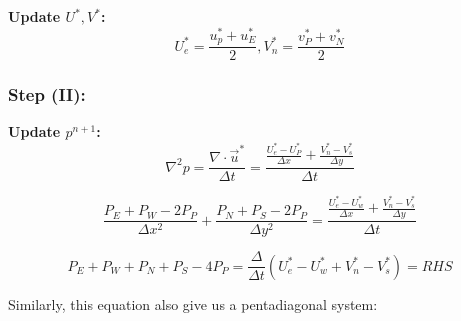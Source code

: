 \documentclass[12pt]{article}
\begin{document}

    
    

    




\textbf{Update $U^*, V^*$:}\\
    $$ U_e^* = \frac{u_p^*+u_E^*}{2} , V_n^* = \frac{v_P^*+v_N^*}{2}$$


\subsubsection{Step (II):}
\textbf{Update $p^{n+1}$:}\\

$$
    \nabla^2 p = \frac{\nabla \cdot \vec{u}^*}{\Delta t}= \frac{\frac{U_e^* - U_P^*}{\Delta x} + \frac{V_n^* - V_s^*}{\Delta y}}{\Delta t}
$$

$$
\frac{P_E + P_W - 2P_P}{\Delta x^2} + \frac{P_N + P_S - 2P_P}{\Delta y^2} = \frac{\frac{U_e^* - U_w^*}{\Delta x} + \frac{V_n^* - V_s^*}{\Delta y}}{\Delta t}
$$

$$
P_E + P_W + P_N + P_S - 4P_P = \frac{\Delta}{\Delta t} \left( U_e^* - U_w^* + V_n^* - V_s^* \right) = RHS
$$

Similarly, this equation also give us a pentadiagonal system:
\end{document}
